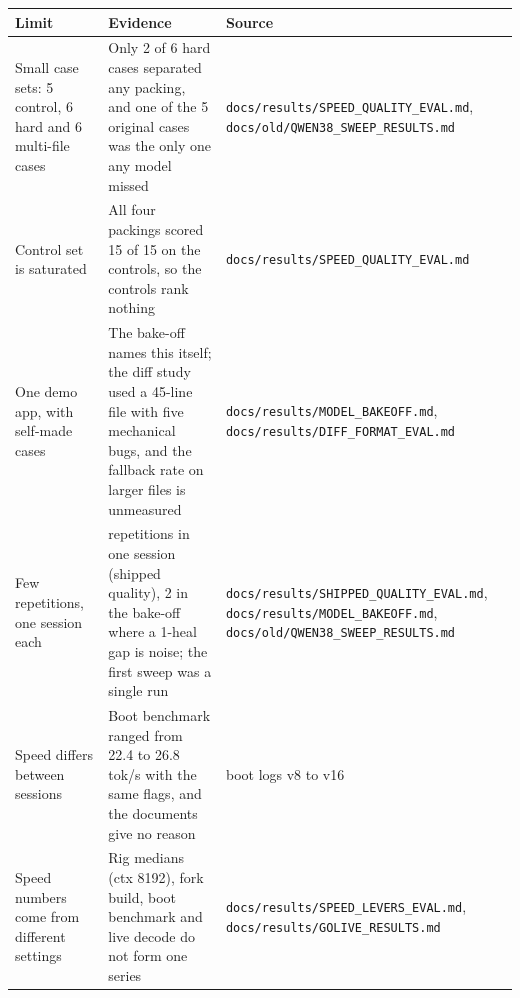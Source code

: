 \begingroup\small
\begin{longtable}{>{\raggedright\arraybackslash}p{0.265\dimexpr\linewidth-6\tabcolsep\relax}>{\raggedright\arraybackslash}p{0.309\dimexpr\linewidth-6\tabcolsep\relax}>{\raggedright\arraybackslash}p{0.425\dimexpr\linewidth-6\tabcolsep\relax}}
\toprule
\rowcolor{gray!14}\textbf{Limit} & \textbf{Evidence} & \textbf{Source} \\
\midrule
\endhead
\bottomrule
\endfoot
\endlastfoot
Small case sets: 5 control, 6 hard and 6 multi-file cases & Only 2 of 6 hard cases separated any packing, and one of the 5 original cases was the only one any model missed & \texttt{docs/\allowbreak{}results/\allowbreak{}SPEED\_\allowbreak{}QUALITY\_\allowbreak{}EVAL.\allowbreak{}md}, \texttt{docs/\allowbreak{}old/\allowbreak{}QWEN38\_\allowbreak{}SWEEP\_\allowbreak{}RESULTS.\allowbreak{}md} \\
Control set is saturated & All four packings scored 15 of 15 on the controls, so the controls rank nothing & \texttt{docs/\allowbreak{}results/\allowbreak{}SPEED\_\allowbreak{}QUALITY\_\allowbreak{}EVAL.\allowbreak{}md} \\
One demo app, with self-made cases & The bake-off names this itself; the diff study used a 45-line file with five mechanical bugs, and the fallback rate on larger files is unmeasured & \texttt{docs/\allowbreak{}results/\allowbreak{}MODEL\_\allowbreak{}BAKEOFF.\allowbreak{}md}, \texttt{docs/\allowbreak{}results/\allowbreak{}DIFF\_\allowbreak{}FORMAT\_\allowbreak{}EVAL.\allowbreak{}md} \\
Few repetitions, one session each & 3 repetitions in one session (shipped quality), 2 in the bake-off where a 1-heal gap is noise; the first sweep was a single run & \texttt{docs/\allowbreak{}results/\allowbreak{}SHIPPED\_\allowbreak{}QUALITY\_\allowbreak{}EVAL.\allowbreak{}md}, \texttt{docs/\allowbreak{}results/\allowbreak{}MODEL\_\allowbreak{}BAKEOFF.\allowbreak{}md}, \texttt{docs/\allowbreak{}old/\allowbreak{}QWEN38\_\allowbreak{}SWEEP\_\allowbreak{}RESULTS.\allowbreak{}md} \\
Speed differs between sessions & Boot benchmark ranged from 22.4 to 26.8 tok/\allowbreak{}s with the same flags, and the documents give no reason & boot logs v8 to v16 \\
Speed numbers come from different settings & Rig medians (ctx 8192), fork build, boot benchmark and live decode do not form one series & \texttt{docs/\allowbreak{}results/\allowbreak{}SPEED\_\allowbreak{}LEVERS\_\allowbreak{}EVAL.\allowbreak{}md}, \texttt{docs/\allowbreak{}results/\allowbreak{}GOLIVE\_\allowbreak{}RESULTS.\allowbreak{}md} \\

\end{longtable}
